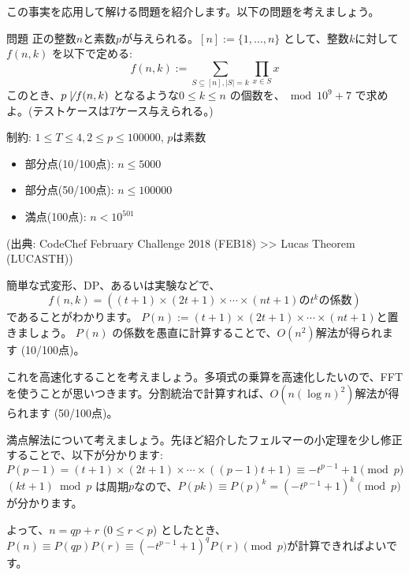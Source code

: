 \documentclass{jsarticle}
\begin{document}
  この事実を応用して解ける問題を紹介します。以下の問題を考えましょう。
  \begin{itembox}[l]{問題}
   正の整数$n$と素数$p$が与えられる。$[n] := \{1,\ldots, n\}$ として、整数$k$に対して$f(n, k)$ を以下で定める:
   \begin{displaymath}
    f(n, k) := \sum_{S \subseteq [n], |S| = k} \prod_{x \in S} x
   \end{displaymath}
   このとき、$p \not \mid f(n, k)$ となるような$0 \le k \le n$ の個数を、${} \bmod 10^9+7$ で求めよ。(テストケースは$T$ケース与えられる。)

   制約: $1 \le T \le 4, 2 \le p \le 100000$, $p$は素数
   \begin{itemize}
    \item 部分点(10/100点): $n \le 5000$
    \item 部分点(50/100点): $n \le 100000$
    \item 満点(100点): $n < 10^{501}$
   \end{itemize}

   (出典: CodeChef February Challenge 2018 (FEB18) >> Lucas Theorem (LUCASTH))
  \end{itembox}
  簡単な式変形、DP、あるいは実験などで、
  \begin{displaymath}
   f(n, k) = ((t + 1) \times (2t + 1) \times \cdots \times (nt + 1) \mbox{の$t^k$の係数})
  \end{displaymath}
  であることがわかります。
  $P(n) := (t + 1) \times (2t + 1) \times \cdots \times (nt + 1)$と置きましょう。
  $P(n)$ の係数を愚直に計算することで、$O(n^2)$解法が得られます (10/100点)。

  これを高速化することを考えましょう。多項式の乗算を高速化したいので、FFTを使うことが思いつきます。分割統治で計算すれば、$O(n (\log n)^2)$解法が得られます (50/100点)。

  満点解法について考えましょう。先ほど紹介したフェルマーの小定理を少し修正することで、以下が分かります:
  \begin{displaymath}
   P(p - 1) = (t + 1) \times (2t + 1) \times \cdots \times ((p - 1)t + 1)
   \equiv -t^{p-1} + 1 \pmod p
  \end{displaymath}
  $(kt + 1) \bmod p$ は周期$p$なので、$P(pk) \equiv P(p)^k = (-t^{p-1}+1)^k \pmod p$
  が分かります。

  よって、$n = qp + r$ ($0 \le r < p$) としたとき、$P(n) \equiv P(qp)P(r) \equiv (-t^{p-1}+1)^qP(r) \pmod p$が計算できればよいです。
\end{document}
